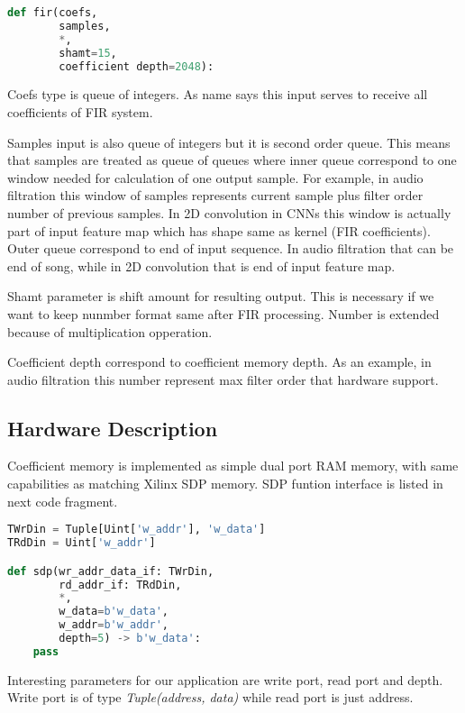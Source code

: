 \documentclass[a4paper, 12pt]{article}
\begin{document}
\begin{lstlisting}[language=Python, caption=FIR function]
def fir(coefs,
        samples,
        *,
        shamt=15,
        coefficient depth=2048):
\end{lstlisting}

Coefs type is queue of integers. As name says this input serves to receive all coefficients of FIR system. 

Samples input is also queue of integers but it is second order queue. This means that samples are treated as queue of queues where inner queue correspond to one window needed for calculation of one output sample. For example, in audio filtration this window of samples represents current sample plus filter order number of previous samples. In 2D convolution in CNNs this window is actually part of input feature map which has shape same as kernel (FIR coefficients). Outer queue correspond to end of input sequence. In audio filtration that can be end of song, while in 2D convolution that is end of input feature map.

Shamt parameter is shift amount for resulting output. This is necessary if we want to keep nunmber format same after FIR processing. Number is extended because of multiplication opperation.

Coefficient depth correspond to coefficient memory depth. As an example, in audio filtration this number represent max filter order that hardware support. 

\subsection{Hardware Description}

Coefficient memory is implemented as simple dual port RAM memory, with same capabilities as matching Xilinx SDP memory. SDP funtion interface is
listed in next code fragment.

\begin{lstlisting}[language=Python, caption=Simple Dual Port memory wrapper]
TWrDin = Tuple[Uint['w_addr'], 'w_data']
TRdDin = Uint['w_addr']

def sdp(wr_addr_data_if: TWrDin,
        rd_addr_if: TRdDin,
        *,
        w_data=b'w_data',
        w_addr=b'w_addr',
        depth=5) -> b'w_data':
    pass
\end{lstlisting}

Interesting parameters for our application are write port, read port and depth. Write port is of type \textit{Tuple(address, data)} while read port is just address.
\end{document}
